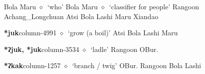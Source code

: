 \hspace{1ex}
         Bola 
\hspace{1ex}
         Maru 
\hspace{1ex}
         $\diamond$~`who'
         Bola 
\hspace{1ex}
         Maru 
\hspace{1ex}
         $\diamond$~`classifier for people'
         Rangoon 
\hspace{1ex}
         Achang\_Longchuan 
\hspace{1ex}
         Atsi 
\hspace{1ex}
         Bola 
\hspace{1ex}
         Lashi 
\hspace{1ex}
         Maru 
\hspace{1ex}
         Xiandao 
  \item {\footnotesize \textbf{*juk}}{\tiny column-4991}
         $\diamond$~`grow (a boil)'
         Atsi 
\hspace{1ex}
         Bola 
\hspace{1ex}
         Lashi 
\hspace{1ex}
         Maru 
  \item {\footnotesize \textbf{*ʔjuk, *juk}}{\tiny column-3534}
         $\diamond$~`ladle'
         Rangoon 
\hspace{1ex}
         OBur. 
  \item {\footnotesize \textbf{*ʔkak}}{\tiny column-1257}
         $\diamond$~`branch / twig'
         OBur. 
\hspace{1ex}
         Rangoon 
\hspace{1ex}
         Bola 
\hspace{1ex}
         Lashi 

